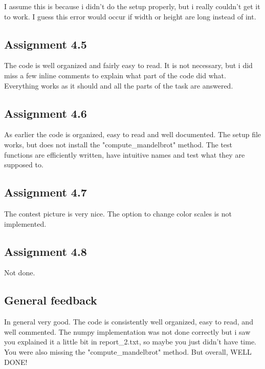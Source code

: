 \documentclass[a4paper]{article}
\begin{document}
I assume this is because i didn't do the setup properly, but i really couldn't get it to work. I guess this error would occur if width or height are long instead of int.

\subsection*{Assignment 4.5}
The code is well organized and fairly easy to read. It is not necessary, but i did miss a few inline comments to explain what part of the code did what. Everything works as it should and all the parts of the task are answered.

\subsection*{Assignment 4.6}
As earlier the code is organized, easy to read and well documented. The setup file works, but does not install the "compute\_mandelbrot" method. The test functions are efficiently written, have intuitive names and test what they are supposed to.

\subsection*{Assignment 4.7}
The contest picture is very nice. The option to change color scales is not implemented.

\subsection*{Assignment 4.8}
Not done.

\subsection*{General feedback}
In general very good. The code is consistently well organized, easy to read, and well commented. The numpy implementation was not done correctly but i saw you explained it a little bit in report\_2.txt, so maybe you just didn't have time. You were also missing the "compute\_mandelbrot" method. But overall, WELL DONE!



\end{document}

